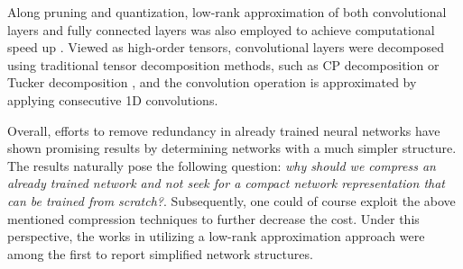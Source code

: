 \documentclass[conference,usletter]{IEEEtran}
\begin{document}
Along pruning and quantization, low-rank approximation of both convolutional layers and fully connected layers was also employed to achieve computational speed up \cite{denil2013predicting,novikov2015tensorizing,lin2016towards}. Viewed as high-order tensors, convolutional layers were decomposed using traditional tensor decomposition methods, such as CP decomposition \cite{jaderberg2014speeding,denton2014exploiting,lebedev2014speeding} or Tucker decomposition \cite{kim2015compression}, and the convolution operation is approximated by applying consecutive 1D convolutions.

Overall, efforts to remove redundancy in already trained neural networks have shown promising results by determining networks with a much simpler structure. The results naturally pose the following question: \textit{why should we compress an already trained network and not seek for a compact network representation that can be trained from scratch?}. Subsequently, one could of course exploit the above mentioned compression techniques to further decrease the cost. Under this perspective, the works in \cite{tai2015convolutional,ioannou2015training} utilizing a low-rank approximation approach were among the first to report simplified network structures.
\end{document}
